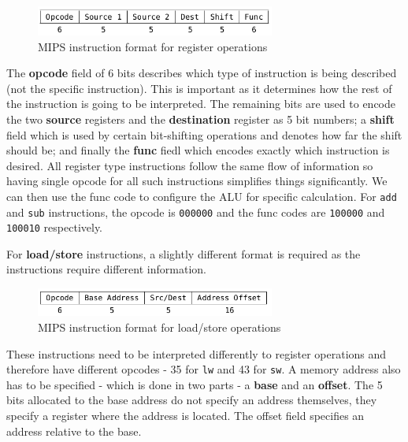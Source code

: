 \documentclass{article}
\begin{document}
	\begin{figure}[ht]
		\centering
		\includegraphics[width=0.7\textwidth]{rtype_instruction}
		\caption{MIPS instruction format for register operations}
		\label{fig:mips register operations}
	\end{figure}
	
	The \textbf{opcode} field of 6 bits describes which type of instruction is being described (not the specific instruction). This is important as it determines how the rest of the instruction is going to be interpreted. The remaining bits are used to encode the two \textbf{source} registers and the \textbf{destination} register as 5 bit numbers; a \textbf{shift} field which is used by certain bit-shifting operations and denotes how far the shift should be; and finally the \textbf{func} fiedl which encodes exactly which instruction is desired. All register type instructions follow the same flow of information so having single opcode for all such instructions simplifies things significantly. We can then use the func code to configure the ALU for specific calculation. For \texttt{add} and \texttt{sub} instructions, the opcode is \texttt{000000} and the func codes are \texttt{100000} and \texttt{100010} respectively. 
	
	\par 
	For \textbf{load/store} instructions, a slightly different format is required as the instructions require different information.
	
	\begin{figure}[ht]
		\centering
		\includegraphics[width=0.7\textwidth]{mips_load_store_instructions}
		\caption{MIPS instruction format for load/store operations}
		\label{fig:mips load store operations}
	\end{figure}
	
	These instructions need to be interpreted differently to register operations and therefore have different opcodes - 35 for \texttt{lw} and 43 for \texttt{sw}. A memory address also has to be specified - which is done in two parts - a \textbf{base} and an \textbf{offset}. The 5 bits allocated to the base address do not specify an address themselves, they specify a register where the address is located. The offset field specifies an address relative to the base.
	
\end{document}
